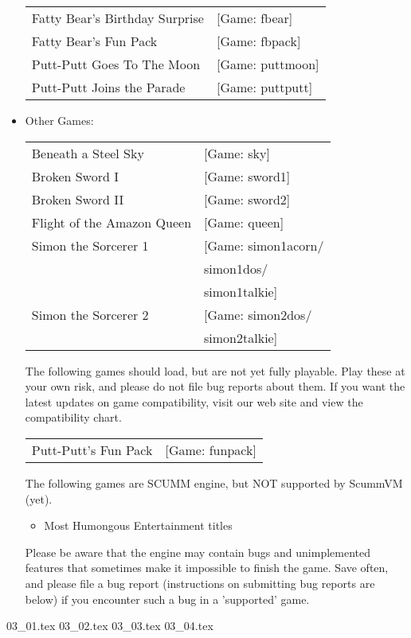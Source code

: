 \begin{itemize}
\begin {tabular} [h] {ll}
    Fatty Bear's Birthday Surprise&                [Game: fbear]\\
    Fatty Bear's Fun Pack&                         [Game: fbpack]\\
    Putt-Putt Goes To The Moon&                    [Game: puttmoon]\\
    Putt-Putt Joins the Parade&                    [Game: puttputt]\\
  \end{tabular}
\item Other Games:\\ 
  \begin{tabular}[h]{ll}
     Beneath a Steel Sky&                             [Game: sky]\\
    Broken Sword I&                                [Game: sword1]\\
    Broken Sword II&                               [Game: sword2]\\
    Flight of the Amazon Queen&                    [Game: queen]\\
     Simon the Sorcerer 1&                         [Game: simon1acorn/\\
     &                                                    simon1dos/\\
     &                                                    simon1talkie]\\
     Simon the Sorcerer 2&                         [Game: simon2dos/\\
     &                                                    simon2talkie]\\
  \end{tabular}

  The following games should load, but are not yet fully playable. Play these at your own risk, and please do not file bug reports about them. If you want
the latest updates on game compatibility, visit our web site and view the
compatibility chart.

\begin{tabular}{ll}
  Putt-Putt's Fun Pack&                          [Game: funpack]\\
\end{tabular}

  The following games are SCUMM engine, but NOT supported by ScummVM (yet).
  \begin{itemize}
  \item Most Humongous Entertainment titles
  \end{itemize}
%
Please be aware that the engine may contain bugs and unimplemented features
that sometimes make it impossible to finish the game. Save often, and please
file a bug report (instructions on submitting bug reports are below) if you
encounter such a bug in a 'supported' game.
\end{itemize}
 {03_01.tex}
 {03_02.tex}
 {03_03.tex}
 {03_04.tex}



